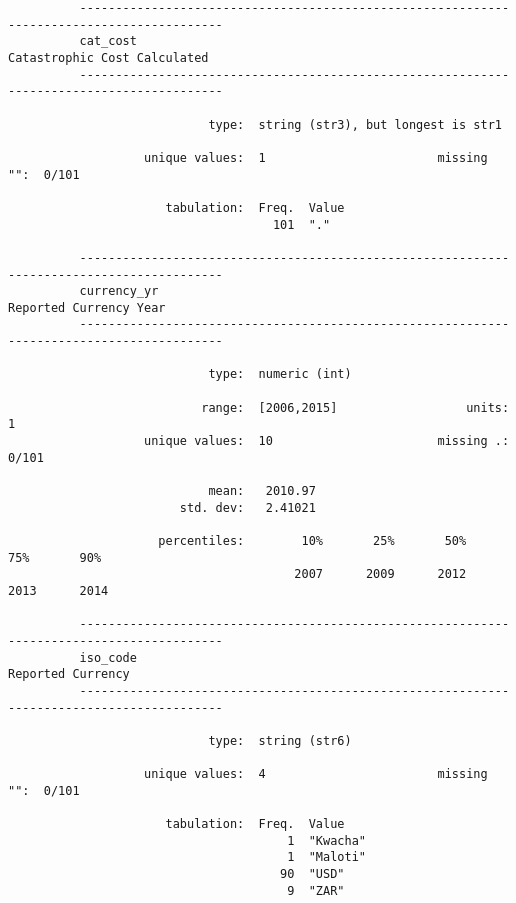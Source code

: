 \documentclass{article}
\begin{document}
\begin{verbatim}
          ------------------------------------------------------------------------------------------
          cat_cost                                                      Catastrophic Cost Calculated
          ------------------------------------------------------------------------------------------
          
                            type:  string (str3), but longest is str1
          
                   unique values:  1                        missing "":  0/101
          
                      tabulation:  Freq.  Value
                                     101  "."
          
          ------------------------------------------------------------------------------------------
          currency_yr                                                         Reported Currency Year
          ------------------------------------------------------------------------------------------
          
                            type:  numeric (int)
          
                           range:  [2006,2015]                  units:  1
                   unique values:  10                       missing .:  0/101
          
                            mean:   2010.97
                        std. dev:   2.41021
          
                     percentiles:        10%       25%       50%       75%       90%
                                        2007      2009      2012      2013      2014
          
          ------------------------------------------------------------------------------------------
          iso_code                                                                 Reported Currency
          ------------------------------------------------------------------------------------------
          
                            type:  string (str6)
          
                   unique values:  4                        missing "":  0/101
          
                      tabulation:  Freq.  Value
                                       1  "Kwacha"
                                       1  "Maloti"
                                      90  "USD"
                                       9  "ZAR"
          

\end{verbatim}
\end{document}
